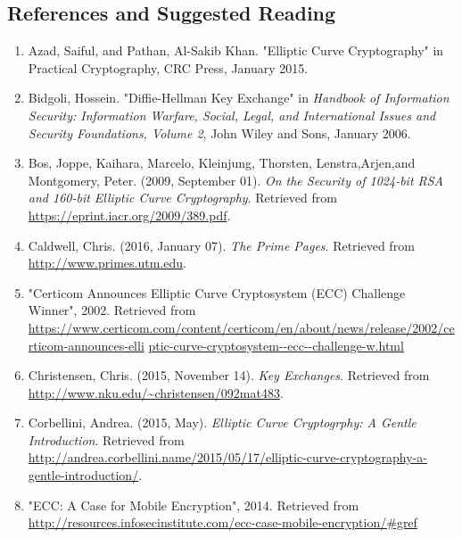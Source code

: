 \subsection{References and Suggested Reading} 
\begin{enumerate}[(1)]

\item\label{Azad}
Azad, Saiful, and Pathan, Al-Sakib Khan. "Elliptic Curve Cryptography" in Practical Cryptography, CRC Press, January 2015.

\item \label{Bidgoli}
Bidgoli, Hossein. "Diffie-Hellman Key Exchange" in \emph{Handbook of Information
Security: Information Warfare, Social, Legal, and International Issues and
Security Foundations, Volume 2}, John Wiley and Sons, January 2006.

\item \label{Bos}
Bos, Joppe, Kaihara, Marcelo, Kleinjung, Thorsten, Lenstra,Arjen,and Montgomery, Peter. (2009, September 01). \emph{On the Security of 1024-bit RSA and 160-bit Elliptic Curve Cryptography}. Retrieved from \url{https://eprint.iacr.org/2009/389.pdf}.

\item \label{Caldwell}
Caldwell, Chris. (2016, January 07). \emph{The Prime Pages}. Retrieved from \url{http://www.primes.utm.edu}.

\item \label{Certicom}
"Certicom Announces Elliptic Curve Cryptosystem (ECC) Challenge Winner",  2002. Retrieved from \url{https://www.certicom.com/content/certicom/en/about/news/release/2002/certicom-announces-elli} \newline \url{ptic-curve-cryptosystem--ecc--challenge-w.html}

\item \label{Christensen}
Christensen, Chris. (2015, November 14). \emph{Key Exchanges}. Retrieved from \url{http://www.nku.edu/~christensen/092mat483}.

\item \label{Corbellini}
Corbellini, Andrea. (2015, May). \emph{Elliptic Curve Cryptogrphy: A Gentle Introduction}. Retrieved from \url{http://andrea.corbellini.name/2015/05/17/elliptic-curve-cryptography-a-gentle-introduction/}.

\item \label{mobile}
"ECC: A Case for Mobile Encryption", 2014. Retrieved from \url{http://resources.infosecinstitute.com/ecc-case-mobile-encryption/#gref}


\end{enumerate}
